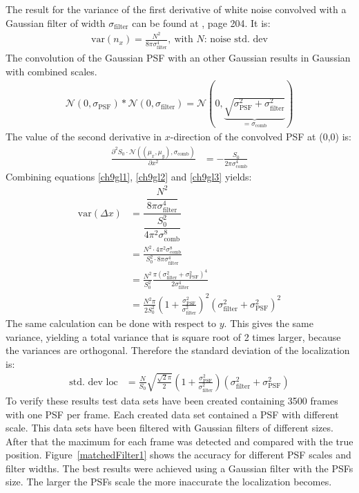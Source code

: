 The result for the variance of the first derivative of white noise convolved with a Gaussian filter of width $\sigma_\text{filter}$ can be found at \cite{ulli}, page 204. It is:
\begin{align}
	\text{var}(n_x) = \frac{N^2}{8\pi\sigma_\text{filter}^4},~\text{with }N\text{: noise std. dev} \label{ch9gl2}
\end{align}
The convolution of the Gaussian PSF  with an other Gaussian results in Gaussian with combined scales.
\begin{align}
 \mathcal{N}(0,\sigma_\text{PSF}) \ast \mathcal{N}(0,\sigma_\text{filter}) = \mathcal{N}\left(0,\underbrace{\sqrt{\sigma_\text{PSF}^2+\sigma_\text{filter}^2}}_{=\sigma_\text{comb}}\right)
\end{align}
The value of the second derivative in $x$-direction of the convolved PSF at (0,0) is:
\begin{align}
 \frac{\partial^2 S_0\cdot\mathcal{N}\left((\mu_x,\mu_y),\sigma_\text{comb}\right)}{\partial x^2}  &=  -\frac{S_0}{2\pi \sigma_\text{comb}^4}  \label{ch9gl3}
\end{align}
Combining equations \ref{ch9gl1}, \ref{ch9gl2} and \ref{ch9gl3} yields:
\begin{align}
\text{var}\left(\Delta x\right) &= \dfrac{\dfrac{N^2}{8\pi\sigma_\text{filter}^4}}{\dfrac{S_0^2}{4\pi^2 \sigma_\text{comb}^8}}\\
&= \frac{N^2\cdot 4\pi^2 \sigma_\text{comb}^8}{S_0^2\cdot8\pi\sigma_\text{filter}^4}\\
&= \frac{N^2}{S_0^2} \frac{\pi \left(\sigma_\text{filter}^2+\sigma_\text{PSF}^2\right)^4}{2\sigma_\text{filter}^4}\\
&= \frac{N^2\pi}{2S_0^2} \left(1+\frac{\sigma_\text{PSF}^2}{\sigma_\text{filter}^2}\right)^2\left(\sigma_\text{filter}^2+\sigma_\text{PSF}^2\right)^2 
\end{align}
The same calculation can be done with respect to $y$. This gives the same variance, yielding a total variance that is square root of 2 times larger, because the variances are orthogonal.
Therefore the standard deviation of the localization is:
\begin{align}
 \text{std. dev loc}&=\frac{N}{S_0}\sqrt{\frac{\sqrt{2}\pi}{2}}
 \left(1+\frac{\sigma_\text{PSF}^2}{\sigma_\text{filter}^2}\right)\left(\sigma_\text{filter}^2+\sigma_\text{PSF}^2\right) 
\end{align}
To verify these results test data sets have been created containing 3500 frames with one PSF per frame. Each created data set contained a PSF with different scale. This data sets have been filtered with Gaussian filters of different sizes. After that the maximum for each frame was detected and compared with the true position. Figure~\ref{matchedFilter1} shows the accuracy for different PSF scales and filter widths.\newline
The best results were achieved using a Gaussian filter with the PSFs size. The larger the PSFs scale the more inaccurate the localization becomes.\newline


